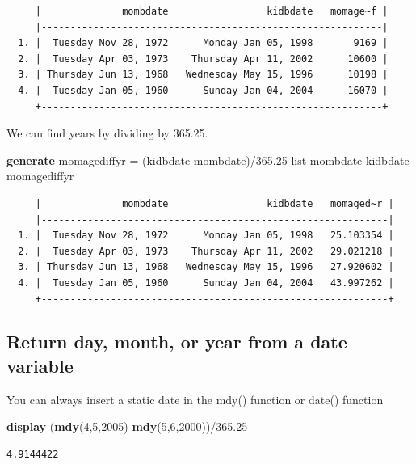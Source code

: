 \documentclass[
]{book}
\newenvironment{Shaded}{\begin{snugshade}}{\end{snugshade}}
\newcommand{\FunctionTok}[1]{\textcolor[rgb]{0.13,0.29,0.53}{\textbf{#1}}}
\newcommand{\KeywordTok}[1]{\textcolor[rgb]{0.13,0.29,0.53}{\textbf{#1}}}
\newcommand{\NormalTok}[1]{#1}
\newcommand{\OtherTok}[1]{\textcolor[rgb]{0.56,0.35,0.01}{#1}}
\begin{document}
\begin{verbatim}
     |              mombdate                 kidbdate   momage~f |
     |-----------------------------------------------------------|
  1. |  Tuesday Nov 28, 1972      Monday Jan 05, 1998       9169 |
  2. |  Tuesday Apr 03, 1973    Thursday Apr 11, 2002      10600 |
  3. | Thursday Jun 13, 1968   Wednesday May 15, 1996      10198 |
  4. |  Tuesday Jan 05, 1960      Sunday Jan 04, 2004      16070 |
     +-----------------------------------------------------------+
\end{verbatim}

We can find years by dividing by 365.25.

\begin{Shaded}
\begin{Highlighting}[]
\KeywordTok{generate}\NormalTok{ momagediffyr = (kidbdate{-}mombdate)/365.25}
\OtherTok{list}\NormalTok{ mombdate kidbdate momagediffyr}
\end{Highlighting}
\end{Shaded}

\begin{verbatim}
     |              mombdate                 kidbdate   momaged~r |
     |------------------------------------------------------------|
  1. |  Tuesday Nov 28, 1972      Monday Jan 05, 1998   25.103354 |
  2. |  Tuesday Apr 03, 1973    Thursday Apr 11, 2002   29.021218 |
  3. | Thursday Jun 13, 1968   Wednesday May 15, 1996   27.920602 |
  4. |  Tuesday Jan 05, 1960      Sunday Jan 04, 2004   43.997262 |
     +------------------------------------------------------------+
\end{verbatim}

\subsection{Return day, month, or year from a date variable}\label{return-day-month-or-year-from-a-date-variable}

You can always insert a static date in the mdy() function or date() function

\begin{Shaded}
\begin{Highlighting}[]
\KeywordTok{display}\NormalTok{ (}\FunctionTok{mdy}\NormalTok{(4,5,2005){-}}\FunctionTok{mdy}\NormalTok{(5,6,2000))/365.25}
\end{Highlighting}
\end{Shaded}

\begin{verbatim}
4.9144422
\end{verbatim}
\end{document}
